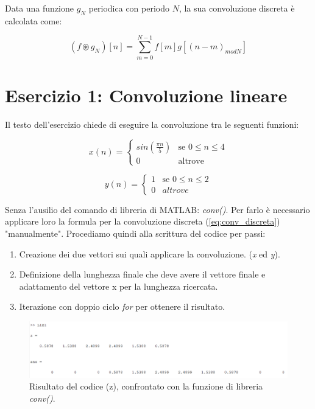 Data una funzione $g_N$ periodica con periodo $N$, la sua convoluzione discreta è calcolata come:

\begin{equation}
	\label{eq:conv_circ_disc}
	(f \circledast g_N)[n] = \sum^{N-1}_{m=0} f[m]g[(n-m)_{mod N}]
\end{equation}




\section{Esercizio 1: Convoluzione lineare}
Il testo dell'esercizio chiede di eseguire la convoluzione tra le seguenti funzioni:

\begin{equation}
	\label{eq:x1_lab1}
	x(n) = \begin{cases} 
	sin(\frac{\pi n}{5}) & \mbox{se }  0 \le n \le 4 \\ 
	0 & \mbox{altrove} 
	\end{cases}
\end{equation} 

\begin{equation}
	\label{eq:y1_lab1}
	y(n) = \begin{cases}
	1 & \mbox{se } 0 \le n \le 2 \\
	0 & altrove	
	\end{cases}
\end{equation}

Senza l'ausilio del comando di libreria di MATLAB: \textit{conv()}. Per farlo è necessario applicare loro la formula per la convoluzione discreta (\ref{eq:conv_discreta}) "manualmente". Procediamo quindi alla scrittura del codice per passi:

\begin{enumerate}

	\item Creazione dei due vettori sui quali applicare la convoluzione. (\textit{x} ed \textit{y}).
	\item Definizione della lunghezza finale che deve avere il vettore finale e adattamento del vettore x per la lunghezza ricercata.
	\item Iterazione con doppio ciclo \textit{for} per ottenere il risultato.
	
\end{enumerate}

\begin{figure}[H]
\centering
\includegraphics[width=\textwidth]{./images/cap2/convoluzione_es1.png}
\caption{Risultato del codice (z), confrontato con la funzione di libreria \textit{conv()}.}
\label{fig:convoluzione_es1}
\end{figure}

